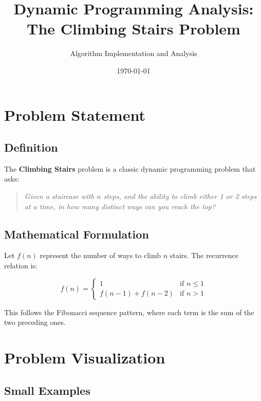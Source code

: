 \documentclass[12pt,a4paper]{article}
\title{\textbf{Dynamic Programming Analysis: \\The Climbing Stairs Problem}}
\author{Algorithm Implementation and Analysis}
\date{\today}
\begin{document}
\maketitle

\tableofcontents
\newpage

\section{Problem Statement}

\subsection{Definition}
The \textbf{Climbing Stairs} problem is a classic dynamic programming problem that asks: 

\begin{quote}
\textit{Given a staircase with $n$ steps, and the ability to climb either 1 or 2 steps at a time, in how many distinct ways can you reach the top?}
\end{quote}

\subsection{Mathematical Formulation}
Let $f(n)$ represent the number of ways to climb $n$ stairs. The recurrence relation is:

\begin{equation}
f(n) = \begin{cases}
1 & \text{if } n \leq 1 \\
f(n-1) + f(n-2) & \text{if } n > 1
\end{cases}
\end{equation}

This follows the Fibonacci sequence pattern, where each term is the sum of the two preceding ones.

\section{Problem Visualization}

\subsection{Small Examples}
\end{document}
